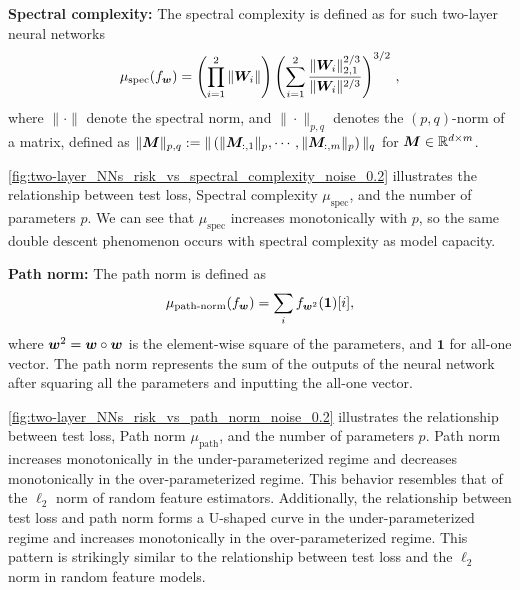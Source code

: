 {\bf Spectral complexity:}
The spectral complexity is defined as for such two-layer neural networks
\[
\mu_{\text{spec}}(f_{\boldsymbol w}) = \left( \prod_{i=1}^{2} \|{\boldsymbol W}_i\| \right) \left( \sum_{i=1}^{2} \frac{\|{\boldsymbol W}_i\|_{2,1}^{2/3}}{\|{\boldsymbol W}_i\|^{2/3}} \right)^{3/2}\,,
\]
where \(\|\cdot\|\) denote the spectral norm, and \(\|\cdot\|_{p,q}\) denotes the \((p,q)\)-norm of a matrix, defined as \(\|{\boldsymbol M}\|_{p,q} := \|\left(\|{\boldsymbol M}_{:,1}\|_p,\cdots,\|{\boldsymbol M}_{:,m}\|_p\right)\|_q\) for \({\boldsymbol M} \in \mathbb{R}^{d\times m}\).

\begin{figure*}[!ht]
    \centering
    \caption{Experiments on two-layer fully connected neural networks with noise level $\eta=0.2$. The \textbf{left} figure is the same as \cref{fig:fro_a}. The \textbf{middle} figure shows the relationship between the path norm \(\mu_{\text{spec}}\) and \(p\). The \textbf{right} figure shows the relationship between the test loss and \(\mu_{\text{spec}}\).}
    \label{fig:two-layer_NNs_risk_vs_spectral_complexity_noise_0.2}
\end{figure*}

\cref{fig:two-layer_NNs_risk_vs_spectral_complexity_noise_0.2} illustrates the relationship between test loss, Spectral complexity \(\mu_{\text{spec}}\), and the number of parameters \(p\). We can see that \(\mu_{\text{spec}}\) increases monotonically with \(p\), so the same double descent phenomenon occurs with spectral complexity as model capacity.

{\bf Path norm:} The path norm is defined as 
\[
\mu_{\text{path-norm}}(f_{\boldsymbol w}) = \sum_{i} f_{{\boldsymbol w}^2}(\bm{1})[i],
\]
where \({\boldsymbol w}^2 = {\boldsymbol w} \circ {\boldsymbol w}\) is the element-wise square of the parameters, and \(\bm{1}\) for all-one vector. The path norm represents the sum of the outputs of the neural network after squaring all the parameters and inputting the all-one vector.

\cref{fig:two-layer_NNs_risk_vs_path_norm_noise_0.2} illustrates the relationship between test loss, Path norm \(\mu_{\text{path}}\), and the number of parameters \(p\). Path norm increases monotonically in the under-parameterized regime and decreases monotonically in the over-parameterized regime. This behavior resembles that of the \(\ell_2\) norm of random feature estimators. Additionally, the relationship between test loss and path norm forms a U-shaped curve in the under-parameterized regime and increases monotonically in the over-parameterized regime. This pattern is strikingly similar to the relationship between test loss and the \(\ell_2\) norm in random feature models.



